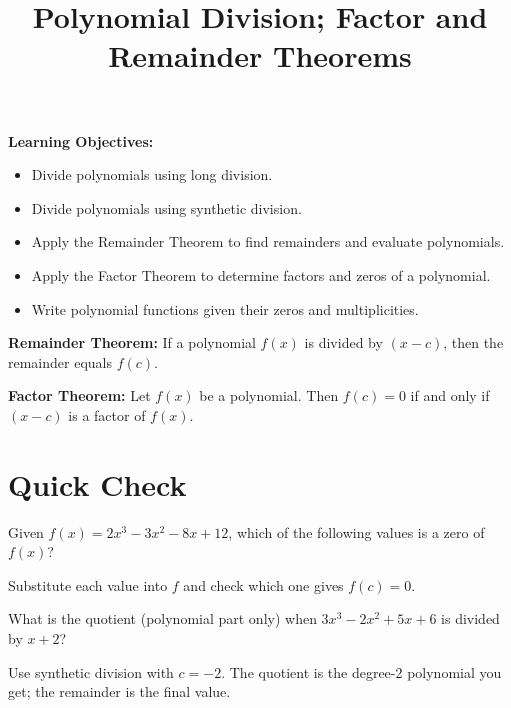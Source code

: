 \documentclass{ximera}
\title{Polynomial Division; Factor and Remainder Theorems}
\begin{document}
\begin{abstract}
\end{abstract}
\maketitle

\textbf{Learning Objectives:}
\begin{itemize}
  \item Divide polynomials using long division.
  \item Divide polynomials using synthetic division.
  \item Apply the Remainder Theorem to find remainders and evaluate polynomials.
  \item Apply the Factor Theorem to determine factors and zeros of a polynomial.
  \item Write polynomial functions given their zeros and multiplicities.
\end{itemize}
\medskip

\noindent\textbf{Remainder Theorem:} If a polynomial $f(x)$ is divided by $(x-c)$, then the remainder equals $f(c)$.

\medskip

\noindent\textbf{Factor Theorem:} Let $f(x)$ be a polynomial. Then $f(c)=0$ if and only if $(x-c)$ is a factor of $f(x)$.

\bigskip
\section*{Quick Check}

\begin{problem}
Given $f(x) = 2x^3 - 3x^2 - 8x + 12$, which of the following values is a zero of $f(x)$?
\begin{hint}
Substitute each value into $f$ and check which one gives $f(c)=0$.
\end{hint}
\begin{multipleChoice}
\end{multipleChoice}
\end{problem}

\begin{problem}
What is the quotient (polynomial part only) when $3x^3 - 2x^2 + 5x + 6$ is divided by $x + 2$?
\begin{hint}
Use synthetic division with $c = -2$. The quotient is the degree-2 polynomial you get; the remainder is the final value.
\end{hint}
\begin{multipleChoice}
\end{multipleChoice}
\end{problem}
\end{document}
